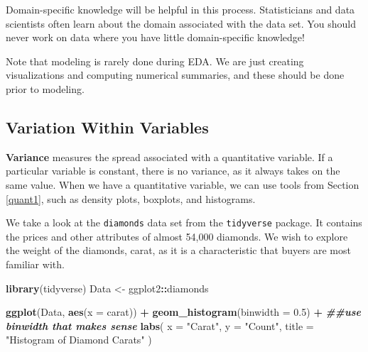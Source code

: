 \documentclass[
]{book}
\newenvironment{Shaded}{\begin{snugshade}}{\end{snugshade}}
\newcommand{\AttributeTok}[1]{\textcolor[rgb]{0.13,0.29,0.53}{#1}}
\newcommand{\DocumentationTok}[1]{\textcolor[rgb]{0.56,0.35,0.01}{\textbf{\textit{#1}}}}
\newcommand{\FloatTok}[1]{\textcolor[rgb]{0.00,0.00,0.81}{#1}}
\newcommand{\FunctionTok}[1]{\textcolor[rgb]{0.13,0.29,0.53}{\textbf{#1}}}
\newcommand{\NormalTok}[1]{#1}
\newcommand{\OtherTok}[1]{\textcolor[rgb]{0.56,0.35,0.01}{#1}}
\newcommand{\SpecialCharTok}[1]{\textcolor[rgb]{0.81,0.36,0.00}{\textbf{#1}}}
\newcommand{\StringTok}[1]{\textcolor[rgb]{0.31,0.60,0.02}{#1}}
\theoremstyle{definition}
\theoremstyle{definition}
\theoremstyle{definition}
\theoremstyle{definition}
\theoremstyle{remark}
\begin{document}
Domain-specific knowledge will be helpful in this process. Statisticians and data scientists often learn about the domain associated with the data set. You should never work on data where you have little domain-specific knowledge!

Note that modeling is rarely done during EDA. We are just creating visualizations and computing numerical summaries, and these should be done prior to modeling.

\hypertarget{variation-within-variables}{%
\subsection{Variation Within Variables}\label{variation-within-variables}}

\textbf{Variance} measures the spread associated with a quantitative variable. If a particular variable is constant, there is no variance, as it always takes on the same value. When we have a quantitative variable, we can use tools from Section \ref{quant1}, such as density plots, boxplots, and histograms.

We take a look at the \texttt{diamonds} data set from the \texttt{tidyverse} package. It contains the prices and other attributes of almost 54,000 diamonds. We wish to explore the weight of the diamonds, carat, as it is a characteristic that buyers are most familiar with.

\begin{Shaded}
\begin{Highlighting}[]
\FunctionTok{library}\NormalTok{(tidyverse)}
\NormalTok{Data }\OtherTok{\textless{}{-}}\NormalTok{ ggplot2}\SpecialCharTok{::}\NormalTok{diamonds}
\end{Highlighting}
\end{Shaded}

\begin{Shaded}
\begin{Highlighting}[]
\FunctionTok{ggplot}\NormalTok{(Data, }\FunctionTok{aes}\NormalTok{(}\AttributeTok{x =}\NormalTok{ carat)) }\SpecialCharTok{+}
  \FunctionTok{geom\_histogram}\NormalTok{(}\AttributeTok{binwidth =} \FloatTok{0.5}\NormalTok{) }\SpecialCharTok{+} \DocumentationTok{\#\#use binwidth that makes sense}
  \FunctionTok{labs}\NormalTok{(}
    \AttributeTok{x =} \StringTok{"Carat"}\NormalTok{,}
    \AttributeTok{y =} \StringTok{"Count"}\NormalTok{,}
    \AttributeTok{title =} \StringTok{"Histogram of Diamond Carats"}
\NormalTok{  )}
\end{Highlighting}
\end{Shaded}
\end{document}
